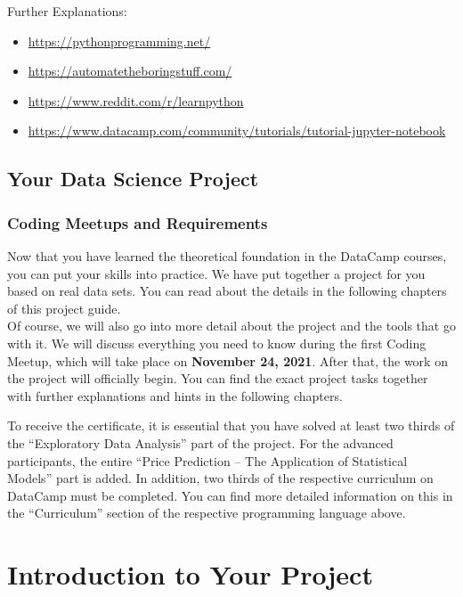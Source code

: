 \documentclass[
  11pt,
]{article}
\providecommand{\tightlist}{%
  \setlength{\itemsep}{0pt}\setlength{\parskip}{0pt}}
\begin{document}
Further Explanations:

\begin{itemize}
\tightlist
\item
  \url{https://pythonprogramming.net/}
\item
  \url{https://automatetheboringstuff.com/}
\item
  \url{https://www.reddit.com/r/learnpython}
\item
  \url{https://www.datacamp.com/community/tutorials/tutorial-jupyter-notebook}
\end{itemize}

\hypertarget{your-data-science-project}{%
\subsection{Your Data Science Project}\label{your-data-science-project}}

\hypertarget{coding-meetups-and-requirements}{%
\subsubsection{Coding Meetups and Requirements}\label{coding-meetups-and-requirements}}

Now that you have learned the theoretical foundation in the DataCamp courses, you can put your skills into practice. We have put together a project for you based on real data sets. You can read about the details in the following chapters of this project guide.\\
Of course, we will also go into more detail about the project and the tools that go with it. We will discuss everything you need to know during the first Coding Meetup, which will take place on \textbf{November 24, 2021}. After that, the work on the project will officially begin.
You can find the exact project tasks together with further explanations and hints in the following chapters.

To receive the certificate, it is essential that you have solved at least two thirds of the ``Exploratory Data Analysis'' part of the project. For the advanced participants, the entire ``Price Prediction -- The Application of Statistical Models'' part is added. In addition, two thirds of the respective curriculum on DataCamp must be completed. You can find more detailed information on this in the ``Curriculum'' section of the respective programming language above.

\newpage

\hypertarget{introduction-to-your-project}{%
\section{Introduction to Your Project}\label{introduction-to-your-project}}
\end{document}
